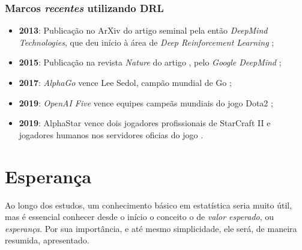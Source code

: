\documentclass{article}
\begin{document}
            \subsubsection{Marcos \emph{recentes} utilizando DRL}
            
                \begin{itemize}
                
                    \item \textbf{2013}: Publicação no ArXiv do artigo seminal \emph{} pela então \emph{DeepMind Technologies}, que deu início à área de \emph{Deep Reinforcement Learning} \cite{Mnih2013};
                    
                    \item \textbf{2015}: Publicação na revista \emph{Nature} do artigo \emph{}, pelo \emph{Google DeepMind} \cite{Mnih2015};
                    
                    \item \textbf{2017}: \emph{AlphaGo} vence Lee Sedol, campão mundial de Go \cite{Silver2016,AlphaGo2017};
                    
                    \item \textbf{2019}: \emph{OpenAI Five} vence equipes campeãs mundiais do jogo Dota2 \cite{Openai2019};
                    
                    \item \textbf{2019}: AlphaStar vence dois jogadores profissionais de StarCraft II e jogadores humanos nos servidores oficias do jogo \cite{Vinyals2019}.
                    
                \end{itemize}

    \section{Esperança}
            
        Ao longo dos estudos, um conhecimento básico em estatística seria muito útil, mas é essencial conhecer desde o início o conceito o de \emph{valor esperado}, ou \emph{esperança}. Por sua importância, e até mesmo simplicidade, ele será, de maneira resumida, apresentado.
        
\end{document}
